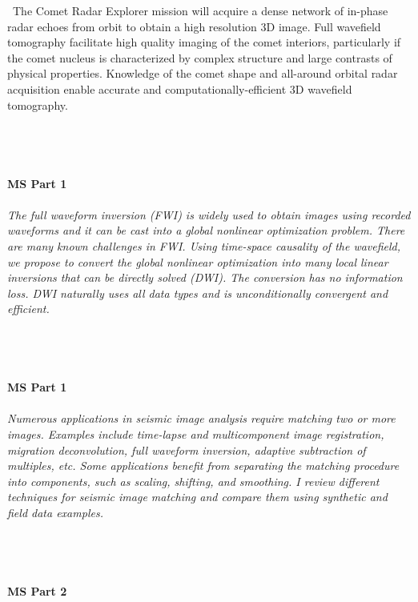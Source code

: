 \begin{multicols}{2}
{\
The Comet Radar Explorer mission will acquire a dense network of in-phase radar echoes from orbit to obtain a high resolution 3D image. Full wavefield tomography facilitate high quality imaging of the comet interiors, particularly if the comet nucleus is characterized by complex structure and large contrasts of physical properties. Knowledge of the comet shape and all-around orbital radar acquisition enable accurate and computationally-efficient 3D wavefield tomography.}\\
\\ 
    \\
    \\\\
    \noindent\textbf{MS Part 1}\\
\\  
    \textit{The full waveform inversion (FWI) is widely used to obtain images using recorded waveforms and it can be cast into a global nonlinear optimization problem. There are many known challenges in FWI. Using time-space causality of the wavefield, we propose to convert the global nonlinear optimization into many local linear inversions that can be directly solved (DWI). The conversion has no information loss. DWI naturally uses all data types and is unconditionally convergent and efficient.}\\
\\ 
    \\
    \\\\
    \noindent\textbf{MS Part 1}\\
\\  
    \textit{Numerous applications in seismic image analysis require matching two or more images. Examples include time-lapse and multicomponent image registration, migration deconvolution, full waveform inversion, adaptive subtraction of multiples, etc. Some applications benefit from separating the matching procedure into components, such as scaling, shifting, and smoothing. I review different techniques for seismic image matching and compare them using synthetic and field data examples.}\\
\\ 
    \\
    \\\\
    \noindent\textbf{MS Part 2}\\
\\  

\end{multicols}
